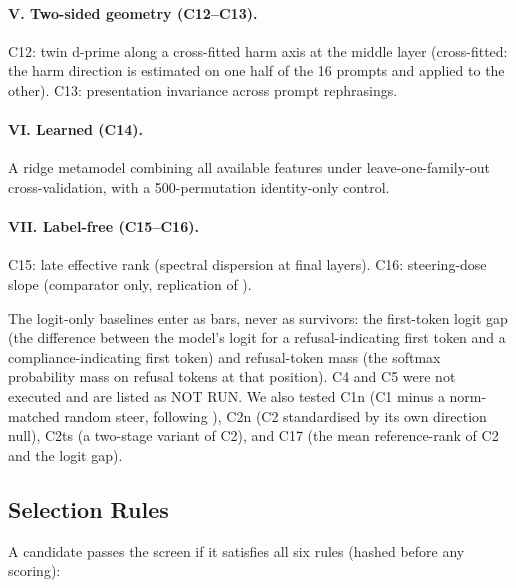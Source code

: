 \documentclass[11pt,letterpaper]{article}
\begin{document}
\paragraph{V. Two-sided geometry (C12--C13).}
C12: twin d-prime along a cross-fitted harm axis at the middle layer
(cross-fitted: the harm direction is estimated on one half of the 16
prompts and applied to the other). C13: presentation invariance across
prompt rephrasings.

\paragraph{VI. Learned (C14).}
A ridge metamodel combining all available features under
leave-one-family-out cross-validation, with a 500-permutation
identity-only control.

\paragraph{VII. Label-free (C15--C16).}
C15: late effective rank (spectral dispersion at final layers). C16:
steering-dose slope (comparator only, replication of
\citealt{Li2026}).

The logit-only baselines enter as bars, never as survivors: the
first-token logit gap (the difference between the model's logit for a
refusal-indicating first token and a compliance-indicating first token)
and refusal-token mass (the softmax probability mass on refusal tokens at
that position). C4 and C5 were not executed and are listed as NOT RUN. We
also tested C1n (C1 minus a norm-matched random steer, following
\citealt{Malla2026}), C2n (C2 standardised by its own direction null),
C2ts (a two-stage variant of C2), and C17 (the mean reference-rank of C2
and the logit gap).

\subsection{Selection Rules}
\label{sec:rules}

A candidate passes the screen if it satisfies all six rules
(hashed before any scoring):
\end{document}
